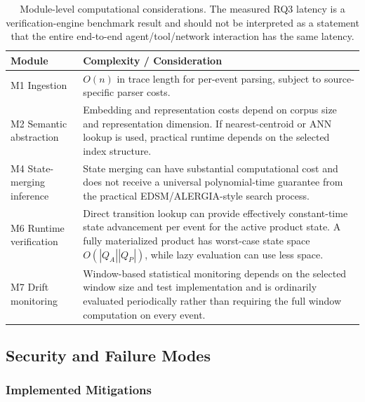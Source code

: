 \documentclass[11pt,a4paper]{article}
\begin{document}
\begin{table}[!htbp]
\centering
\small
\begin{tabular}{L{4.6cm} L{9.2cm}}
\toprule
\textbf{Module} & \textbf{Complexity / Consideration} \\
\midrule

M1 Ingestion &
$O(n)$ in trace length for per-event parsing, subject to source-specific parser costs. \\

M2 Semantic abstraction &
Embedding and representation costs depend on corpus size and representation dimension.
If nearest-centroid or ANN lookup is used, practical runtime depends on the selected
index structure. \\

M4 State-merging inference &
State merging can have substantial computational cost and does not receive a universal
polynomial-time guarantee from the practical EDSM/ALERGIA-style search process. \\

M6 Runtime verification &
Direct transition lookup can provide effectively constant-time state advancement per
event for the active product state. A fully materialized product has worst-case state
space $O(|Q_A||Q_P|)$, while lazy evaluation can use less space. \\

M7 Drift monitoring &
Window-based statistical monitoring depends on the selected window size and test
implementation and is ordinarily evaluated periodically rather than requiring the full
window computation on every event. \\

\bottomrule
\end{tabular}

\caption{Module-level computational considerations. The measured RQ3 latency is a
verification-engine benchmark result and should not be interpreted as a statement that
the entire end-to-end agent/tool/network interaction has the same latency.}
\end{table}

\subsection{Security and Failure Modes}

\subsubsection*{Implemented Mitigations}
\end{document}
